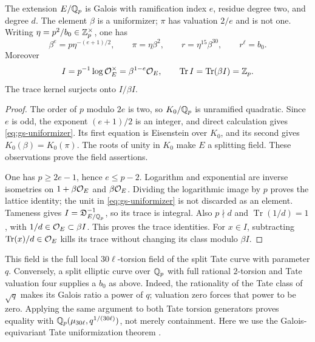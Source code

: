 \begin{lemma}\label{lem:gs-field}
The extension $E/\mathbb Q_p$ is Galois with ramification index $e$, residue
degree two, and degree $d$. The element $\beta$ is a uniformizer;
$\pi$ has valuation $2/e$ and is not one. Writing
$\eta=p^2/b_0\in\mathbb Z_p^\times$, one has
\begin{equation}\label{eq:gs-uniformizer}
 \beta^e=p\eta^{-(e+1)/2},\qquad
 \pi=\eta\beta^2,\qquad r=\eta^{15}\beta^{30},\qquad r^\ell=b_0.
\end{equation}
Moreover
\begin{equation}\label{eq:gs-log-lattice}
 I=p^{-1}\log\mathcal O_E^\times=\beta^{1-e}\mathcal O_E,
 \qquad \operatorname{Tr}I=\operatorname{Tr}(\beta I)=\mathbb Z_p.
\end{equation}
The trace kernel surjects onto $I/\beta I$.
\end{lemma}
\begin{proof}
The order of $p$ modulo $2e$ is two, so $K_0/\mathbb Q_p$ is unramified
quadratic. Since $e$ is odd, the exponent $(e+1)/2$ is an integer,
and direct calculation gives \eqref{eq:gs-uniformizer}. Its first
equation is Eisenstein over $K_0$, and its second gives
$K_0(\beta)=K_0(\pi)$. The roots of unity in $K_0$ make $E$ a
splitting field. These observations prove the field assertions.

One has $p\ge2e-1$, hence $e\le p-2$. Logarithm and exponential
are inverse isometries on $1+\beta\mathcal O_E$ and $\beta\mathcal O_E$.
Dividing the logarithmic image by $p$ proves the lattice identity;
the unit in \eqref{eq:gs-uniformizer} is not discarded as an element.
Tameness gives $I=\mathfrak D_{E/\mathbb Q_p}^{-1}$, so its trace is
integral. Also $p\nmid d$ and $\operatorname{Tr}(1/d)=1$, with
$1/d\in\mathcal O_E\subset\beta I$. This proves the trace identities.
For $x\in I$, subtracting $\operatorname{Tr}(x)/d\in\mathcal O_E$
kills its trace without changing its class modulo $\beta I$.
\end{proof}

This field is the full local $30\ell$-torsion field of the split
Tate curve with parameter $q$. Conversely, a split elliptic curve
over $\mathbb Q_p$ with full rational $2$-torsion and Tate valuation four
supplies a $b_0$ as above. Indeed, the rationality of the Tate class
of $\sqrt q$ makes its Galois ratio a power of $q$; valuation zero
forces that power to be zero. Applying the same argument to both
Tate torsion generators proves equality with
$\mathbb Q_p(\mu_{30\ell},q^{1/(30\ell)})$, not merely containment.
Here we use the Galois-equivariant Tate uniformization theorem
\cite[Theorem~C.14.1]{Silverman}.

